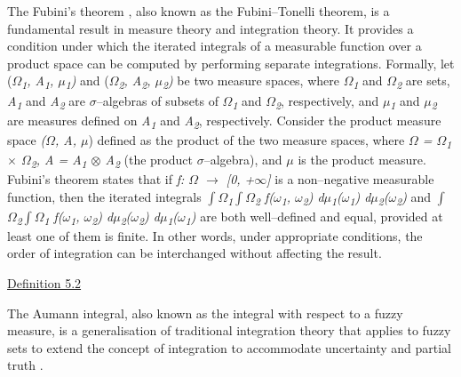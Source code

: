 \documentclass[12pt,a4paper]{report}
\numberwithin{equation}{section}
\begin{document}
The Fubini's theorem \cite{llendeto2007modeling_82}, also known as the Fubini--Tonelli theorem,
is a fundamental result in measure theory and integration theory. It
provides a condition under which the iterated integrals of a measurable
function over a product space can be computed by performing separate
integrations. Formally, let (\emph{$\Omega$\textsubscript{1}, A\textsubscript{1}, $\mu$\textsubscript{1})} and (\emph{$\Omega$\textsubscript{2}, A\textsubscript{2}, $\mu$\textsubscript{2})}
be two measure spaces, where \emph{$\Omega$\textsubscript{1}} and \emph{$\Omega$\textsubscript{2}} are sets, \emph{A\textsubscript{1}}
and \emph{A\textsubscript{2}} are $\sigma$--algebras of subsets of \emph{$\Omega$\textsubscript{1}} and \emph{$\Omega$\textsubscript{2}},
respectively, and \emph{$\mu$\textsubscript{1}} and \emph{$\mu$\textsubscript{2}} are measures defined on
\emph{A\textsubscript{1}} and \emph{A\textsubscript{2}}, respectively. Consider the product measure
space \emph{($\Omega$, A, $\mu$}) defined as the product of the two measure spaces,
where \emph{$\Omega$ = $\Omega$\textsubscript{1} $\times$ $\Omega$\textsubscript{2}, A = A\textsubscript{1} $\otimes$ A\textsubscript{2}} (the product $\sigma$--algebra), and
\emph{$\mu$} is the product measure. Fubini's theorem states that if
\emph{f: $\Omega$ $\rightarrow$ {[}0, +$\infty${]}} is a non--negative measurable function, then
the iterated integrals \emph{$\int$$\Omega$\textsubscript{1}$\int$$\Omega$\textsubscript{2} f($\omega$\textsubscript{1}, $\omega$\textsubscript{2}) d$\mu$\textsubscript{1}($\omega$\textsubscript{1}) d$\mu$\textsubscript{2}($\omega$\textsubscript{2})} and
\emph{$\int$$\Omega$\textsubscript{2}$\int$$\Omega$\textsubscript{1} f($\omega$\textsubscript{1}, $\omega$\textsubscript{2}) d$\mu$\textsubscript{2}($\omega$\textsubscript{2}) d$\mu$\textsubscript{1}($\omega$\textsubscript{1})} are both well--defined and equal,
provided at least one of them is finite. In other words, under
appropriate conditions, the order of integration can be interchanged
without affecting the result.

\uline{Definition 5.2}

The Aumann integral, also known as the integral with respect to a fuzzy
measure, is a generalisation of traditional integration theory that
applies to fuzzy sets to extend the concept of integration to
accommodate uncertainty and partial truth \cite{aumann1965integrals_83}.
\end{document}
